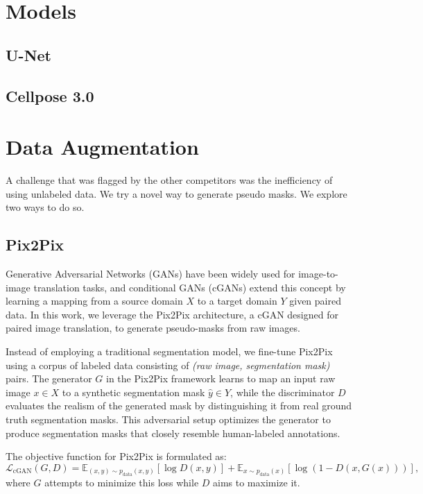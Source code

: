 \documentclass[]{article}
\begin{document}
\section{Models}

\subsection{U-Net}

\subsection{Cellpose 3.0}


\section{Data Augmentation}

A challenge that was flagged by the other competitors was the inefficiency of using unlabeled data. We try a novel way to generate pseudo masks. We explore two ways to do so.
\subsection{Pix2Pix}
Generative Adversarial Networks (GANs) have been widely used for image-to-image translation tasks, and conditional GANs (cGANs) extend this concept by learning a mapping from a source domain \( X \) to a target domain \( Y \) given paired data. In this work, we leverage the Pix2Pix architecture, a cGAN designed for paired image translation, to generate pseudo-masks from raw images.

Instead of employing a traditional segmentation model, we fine-tune Pix2Pix using a corpus of labeled data consisting of \textit{(raw image, segmentation mask)} pairs. The generator \( G \) in the Pix2Pix framework learns to map an input raw image \( x \in X \) to a synthetic segmentation mask \( \hat{y} \in Y \), while the discriminator \( D \) evaluates the realism of the generated mask by distinguishing it from real ground truth segmentation masks. This adversarial setup optimizes the generator to produce segmentation masks that closely resemble human-labeled annotations.

The objective function for Pix2Pix is formulated as:
\begin{equation}
    \mathcal{L}_{\text{cGAN}}(G, D) = \mathbb{E}_{(x,y) \sim p_{\text{data}}(x,y)} \left[ \log D(x, y) \right] + \mathbb{E}_{x \sim p_{\text{data}}(x)} \left[ \log (1 - D(x, G(x))) \right],
\end{equation}
where \( G \) attempts to minimize this loss while \( D \) aims to maximize it.
\end{document}
